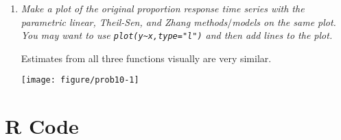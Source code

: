 \documentclass[11pt]{article}\usepackage[]{graphicx}\usepackage[]{color}
\makeatletter
\def\maxwidth{ %
  \ifdim\Gin@nat@width>\linewidth
    \linewidth
  \else
    \Gin@nat@width
  \fi
}
\newenvironment{knitrout}{}{} %
\makeatother
\begin{document}
\begin{enumerate}
The 95\% confidence interval using {\texttt confint(mblm.object)} was (\ensuremath{-0.0003698}, \ensuremath{-0.0002405}).
The 95\% confidence interval using {\texttt zyp.confint(zyp.sen.object)} was (\ensuremath{-0.0005074}, \ensuremath{-0.0001099}).

The widths are nearly the same, but the {\texttt confint(mblm())} confidence interval is shifted up slightly compared to the {\texttt confint.zyp()} confidence interval. It is interesting that there is any difference as theoretically, they are both creating a 95\% confidence interval for the slope coefficient for the Theil-Sen estimate.


\item%
{\it Make a plot of the original proportion response time series with the parametric linear, Theil-Sen, and Zhang methods$/$models on the same plot. You may want to use \verb|plot(y~x,type="l")| and then add lines to the plot.}

Estimates from all three functions visually are very similar.


\begin{knitrout}\footnotesize
{}\color{fgcolor}

{\centering \texttt{[image: figure/prob10-1]} 

}



\end{knitrout}



\end{enumerate}

\appendix
\section*{R Code}
\end{document}
